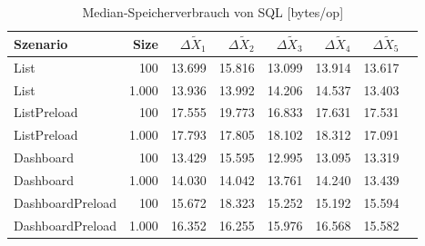 
\begin{table}[ht]
\setlength{\extrarowheight}{-1pt}
\centering
\caption{Median-Speicherverbrauch von SQL [bytes/op]}
\begin{tabular}{lrrrrrrr}
\toprule
Szenario & Size & ${\Delta \tilde{X}_1}$ & ${\Delta \tilde{X}_2}$ & ${\Delta \tilde{X}_3}$ & ${\Delta \tilde{X}_4}$ & ${\Delta \tilde{X}_5}$ \\
\midrule
	List & 100 & \cellcolor{red!0}  13.699 & \cellcolor{red!0}  15.816 & \cellcolor{red!0}  13.099 & \cellcolor{red!0}  13.914 & \cellcolor{red!0}  13.617 \\
	List & 1.000 & \cellcolor{red!0}  13.936 & \cellcolor{red!0}  13.992 & \cellcolor{red!0}  14.206 & \cellcolor{red!0}  14.537 & \cellcolor{red!0}  13.403 \\
	ListPreload & 100 & \cellcolor{red!0}  17.555 & \cellcolor{red!0}  19.773 & \cellcolor{red!0}  16.833 & \cellcolor{red!0}  17.631 & \cellcolor{red!0}  17.531 \\
	ListPreload & 1.000 & \cellcolor{red!0}  17.793 & \cellcolor{red!0}  17.805 & \cellcolor{red!0}  18.102 & \cellcolor{red!0}  18.312 & \cellcolor{red!0}  17.091 \\
	Dashboard & 100 & \cellcolor{red!0}  13.429 & \cellcolor{red!0}  15.595 & \cellcolor{red!0}  12.995 & \cellcolor{red!0}  13.095 & \cellcolor{red!0}  13.319 \\
	Dashboard & 1.000 & \cellcolor{red!0}  14.030 & \cellcolor{red!0}  14.042 & \cellcolor{red!0}  13.761 & \cellcolor{red!0}  14.240 & \cellcolor{red!0}  13.439 \\
	DashboardPreload & 100 & \cellcolor{red!0}  15.672 & \cellcolor{red!0}  18.323 & \cellcolor{red!0}  15.252 & \cellcolor{red!0}  15.192 & \cellcolor{red!0}  15.594 \\
	DashboardPreload & 1.000 & \cellcolor{red!0}  16.352 & \cellcolor{red!0}  16.255 & \cellcolor{red!0}  15.976 & \cellcolor{red!0}  16.568 & \cellcolor{red!0}  15.582 \\
\bottomrule
\end{tabular}
\label{tab:speicherverbrauch_sql}
\end{table}
	